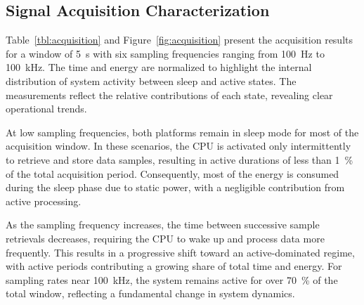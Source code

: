         \subsection{Signal Acquisition Characterization}
            
            Table~\ref{tbl:acquisition} and Figure~\ref{fig:acquisition} present the acquisition results for a window of \SI{5}{\second} with six sampling frequencies ranging from \SI{100}{\hertz} to \SI{100}{\kilo\hertz}. The time and energy are normalized to highlight the internal distribution of system activity between sleep and active states. The measurements reflect the relative contributions of each state, revealing clear operational trends.
            
            At low sampling frequencies, both platforms remain in sleep mode for most of the acquisition window. In these scenarios, the CPU is activated only intermittently to retrieve and store data samples, resulting in active durations of less than \SI{1}{\percent} of the total acquisition period. Consequently, most of the energy is consumed during the sleep phase due to static power, with a negligible contribution from active processing.
            
            As the sampling frequency increases, the time between successive sample retrievals decreases, requiring the CPU to wake up and process data more frequently. This results in a progressive shift toward an active-dominated regime, with active periods contributing a growing share of total time and energy. For sampling rates near \SI{100}{\kilo\hertz}, the system remains active for over \SI{70}{\percent} of the total window, reflecting a fundamental change in system dynamics.

